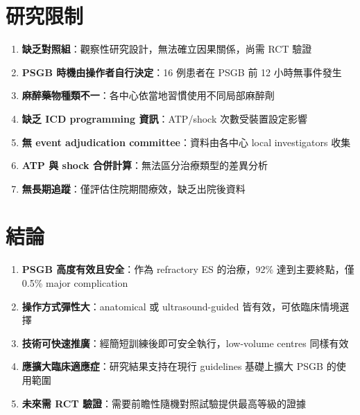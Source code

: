 \documentclass[12pt,a4paper]{article}
\begin{document}
\section{研究限制}

\begin{enumerate}
    \item \textbf{缺乏對照組}：觀察性研究設計，無法確立因果關係，尚需 RCT 驗證
    \item \textbf{PSGB 時機由操作者自行決定}：16 例患者在 PSGB 前 12 小時無事件發生
    \item \textbf{麻醉藥物種類不一}：各中心依當地習慣使用不同局部麻醉劑
    \item \textbf{缺乏 ICD programming 資訊}：ATP/shock 次數受裝置設定影響
    \item \textbf{無 event adjudication committee}：資料由各中心 local investigators 收集
    \item \textbf{ATP 與 shock 合併計算}：無法區分治療類型的差異分析
    \item \textbf{無長期追蹤}：僅評估住院期間療效，缺乏出院後資料
\end{enumerate}

\section{結論}

\begin{enumerate}
    \item \textcolor{emergency_red}{\textbf{PSGB 高度有效且安全}}：作為 refractory ES 的治療，92\% 達到主要終點，僅 0.5\% major complication
    \item \textcolor{emergency_red}{\textbf{操作方式彈性大}}：anatomical 或 ultrasound-guided 皆有效，可依臨床情境選擇
    \item \textcolor{emergency_red}{\textbf{技術可快速推廣}}：經簡短訓練後即可安全執行，low-volume centres 同樣有效
    \item \textcolor{emergency_red}{\textbf{應擴大臨床適應症}}：研究結果支持在現行 guidelines 基礎上擴大 PSGB 的使用範圍
    \item \textcolor{emergency_red}{\textbf{未來需 RCT 驗證}}：需要前瞻性隨機對照試驗提供最高等級的證據
\end{enumerate}
\end{document}
